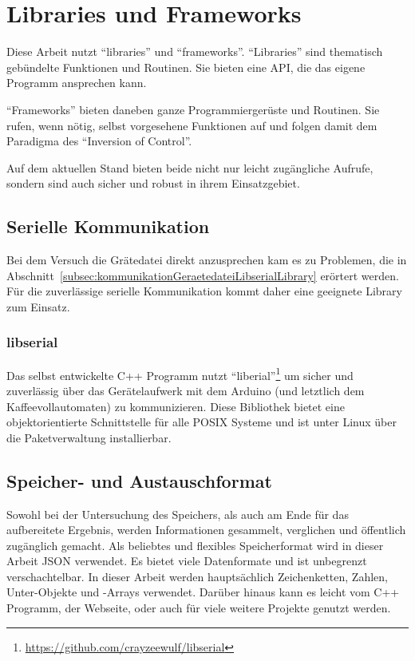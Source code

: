 \section{Libraries und Frameworks}
Diese Arbeit nutzt "`libraries"' und "`frameworks"'.
"`Libraries"' sind thematisch gebündelte Funktionen und Routinen. Sie bieten eine \ac{API}, die das eigene Programm ansprechen kann.

"`Frameworks"' bieten daneben ganze Programmiergerüste und Routinen. Sie rufen, wenn nötig, selbst vorgesehene Funktionen auf und folgen damit dem Paradigma des "`Inversion of Control"'.

Auf dem aktuellen Stand bieten beide nicht nur leicht zugängliche Aufrufe, sondern sind auch sicher und robust in ihrem Einsatzgebiet.

\subsection{Serielle Kommunikation}
Bei dem Versuch die Grätedatei direkt anzusprechen kam es zu Problemen, die in Abschnitt~\ref{subsec:kommunikationGeraetedateiLibserialLibrary} erörtert werden. Für die zuverlässige serielle Kommunikation kommt daher eine geeignete Library zum Einsatz.

\subsubsection{libserial}
Das selbst entwickelte C++ Programm nutzt "`liberial"'\footnote{\url{https://github.com/crayzeewulf/libserial}} um sicher und zuverlässig über das Gerätelaufwerk mit dem Arduino (und letztlich dem Kaffeevollautomaten) zu kommunizieren.
Diese Bibliothek bietet eine objektorientierte Schnittstelle für alle \ac{POSIX} Systeme und ist unter Linux über die Paketverwaltung installierbar.

\subsection{Speicher- und Austauschformat}
Sowohl bei der Untersuchung des Speichers, als auch am Ende für das aufbereitete Ergebnis, werden Informationen gesammelt, verglichen und öffentlich zugänglich gemacht.
Als beliebtes und flexibles Speicherformat wird in dieser Arbeit \ac{JSON} verwendet.
Es bietet viele Datenformate und ist unbegrenzt verschachtelbar.
In dieser Arbeit werden hauptsächlich Zeichenketten, Zahlen, Unter-Objekte und -Arrays verwendet.
Darüber hinaus kann es leicht vom C++ Programm, der Webseite, oder auch für viele weitere Projekte genutzt werden.

